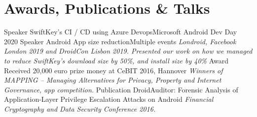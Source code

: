 \documentclass[]{friggeri-cv}
\begin{document}
\section{Awards, Publications \& Talks}
	\begin{entrylist}
        \entry
            {Speaker}
            {SwiftKey’s CI / CD using Azure Devops}{Microsoft Android Dev Day 2020}
            {}
        \entry
            {Speaker}
            {Android App size reduction}{Multiple events}
            {\emph{Londroid, Facebook London 2019 and DroidCon Lisbon 2019. Presented our work on how we managed to reduce SwiftKey's download size by 50\%, and install size by 40\%}}
        \entry
            {Award}
            {Received 20,000 euro prize money at CeBIT 2016, Hannover}{}
            {\emph{Winners of MAPPING -- Managing Alternatives for Privacy, Property and Internet Governance, app competition.}}
        \entry
            {Publication}
            {DroidAuditor: Forensic Analysis of Application-Layer Privilege Escalation Attacks on Android}{}
            {\emph{Financial Cryptography and Data Security Conference 2016.}}        
	\end{entrylist}
\end{document}
